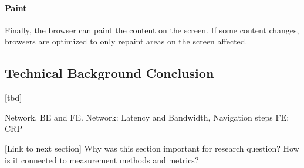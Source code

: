 

\paragraph{Paint}

Finally, the browser can paint the content on the screen.
If some content changes, browsers are optimized to only repaint areas on the screen affected.  %



















\subsection{Technical Background Conclusion}

[tbd]

Network, BE and FE.
Network: Latency and Bandwidth, Navigation steps
FE: CRP

[Link to next section]
Why was this section important for research question?
How is it connected to measurement methods and metrics?






